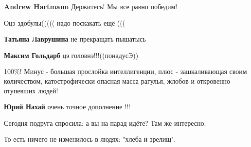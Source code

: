 \begin{itemize}
\begin{itemize}
\textbf{Andrew Hartmann} Держитесь! Мы все равно победим!
\end{itemize}

 
Оцэ здобулы((((( надо поскакать ещё (((

\begin{itemize}
 
\textbf{Татьяна Лаврушина} не прекращать пышатысь

 
\textbf{Максим Гольдарб} цэ головнэ!!!((понадусЭ))
\end{itemize}


100\%! Минус - большая прослойка интеллигенции, плюс - зашкаливающая своим
количеством, катострофически опасная масса рагулья, жлобов и откровенно
отупевших людей!🙈

\begin{itemize}
 
\textbf{Юрий Нахай} очень точное дополнение !!!
\end{itemize}


Сегодня подруга спросила: а вы на парад идёте? Там же интересно.

То есть ничего не изменилось в людях: "хлеба и зрелищ".


\end{itemize}
